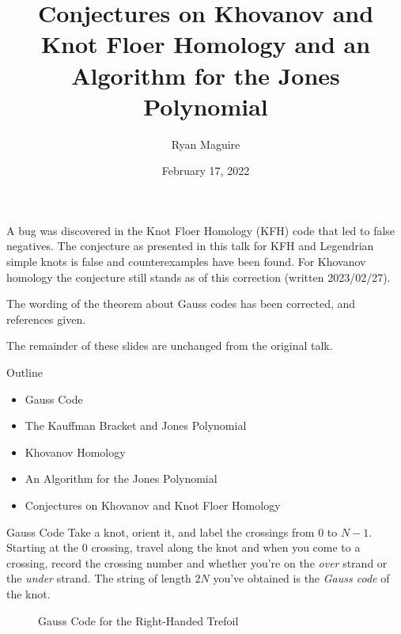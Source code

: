 \documentclass{beamer}
\title{Conjectures on Khovanov and Knot Floer Homology and an Algorithm
       for the Jones Polynomial}
\author{Ryan Maguire}
\date{February 17, 2022}
\begin{document}
    \maketitle
    \begin{frame}{\textbf{\color{red}{Corrections}}}
        A bug was discovered in the Knot Floer Homology (KFH) code that led to
        false negatives. The conjecture as presented in this talk for
        KFH and Legendrian simple knots is false and counterexamples have been
        found. For Khovanov homology the conjecture still stands as of this
        correction (written 2023/02/27).
        \par\hfill\par
        The wording of the theorem about Gauss codes has been corrected, and
        references given.
        \par\hfill\par
        The remainder of these slides are unchanged from the original talk.
    \end{frame}
    \begin{frame}{Outline}
        \begin{itemize}
            \item Gauss Code
            \item The Kauffman Bracket and Jones Polynomial
            \item Khovanov Homology
            \item An Algorithm for the Jones Polynomial
            \item Conjectures on Khovanov and Knot Floer Homology
        \end{itemize}
    \end{frame}
    \begin{frame}{Gauss Code}
        Take a knot, orient it, and label the crossings from 0 to $N-1$.
        Starting at the 0 crossing, travel along the knot and when you come
        to a crossing, record the crossing number and whether you're on the
        \textit{over} strand or the \textit{under} strand. The string of length
        $2N$ you've obtained is the \textit{Gauss code} of the knot.
        \begin{figure}
            \centering
            \caption{Gauss Code for the Right-Handed Trefoil}
            \label{fig:right_handed_trefoil_gauss_code}
        \end{figure}
    \end{frame}
\end{document}
